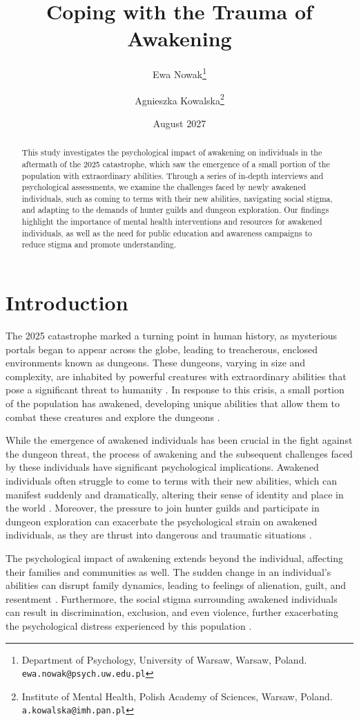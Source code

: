 \documentclass[12pt, a4paper]{article}
\title{Coping with the Trauma of Awakening}
\author{Ewa Nowak\footnote{Department of Psychology, University of Warsaw, Warsaw, Poland. \texttt{ewa.nowak@psych.uw.edu.pl}} \and 
Agnieszka Kowalska\footnote{Institute of Mental Health, Polish Academy of Sciences, Warsaw, Poland. \texttt{a.kowalska@imh.pan.pl}}}
\date{August 2027}
\begin{document}
\maketitle
\begin{abstract}
This study investigates the psychological impact of awakening on individuals in the aftermath of the 2025 catastrophe, which saw the emergence of a small portion of the population with extraordinary abilities. Through a series of in-depth interviews and psychological assessments, we examine the challenges faced by newly awakened individuals, such as coming to terms with their new abilities, navigating social stigma, and adapting to the demands of hunter guilds and dungeon exploration. Our findings highlight the importance of mental health interventions and resources for awakened individuals, as well as the need for public education and awareness campaigns to reduce stigma and promote understanding.
\end{abstract}

\section{Introduction}
The 2025 catastrophe marked a turning point in human history, as mysterious portals began to appear across the globe, leading to treacherous, enclosed environments known as dungeons. These dungeons, varying in size and complexity, are inhabited by powerful creatures with extraordinary abilities that pose a significant threat to humanity \citep{Chen2026}. In response to this crisis, a small portion of the population has awakened, developing unique abilities that allow them to combat these creatures and explore the dungeons \citep{Nakamura2027}.

While the emergence of awakened individuals has been crucial in the fight against the dungeon threat, the process of awakening and the subsequent challenges faced by these individuals have significant psychological implications. Awakened individuals often struggle to come to terms with their new abilities, which can manifest suddenly and dramatically, altering their sense of identity and place in the world \citep{Lee2027}. Moreover, the pressure to join hunter guilds and participate in dungeon exploration can exacerbate the psychological strain on awakened individuals, as they are thrust into dangerous and traumatic situations \citep{Kim2027}.

The psychological impact of awakening extends beyond the individual, affecting their families and communities as well. The sudden change in an individual's abilities can disrupt family dynamics, leading to feelings of alienation, guilt, and resentment \citep{Kowalczyk2027}. Furthermore, the social stigma surrounding awakened individuals can result in discrimination, exclusion, and even violence, further exacerbating the psychological distress experienced by this population \citep{Nowak2027}.
\end{document}
